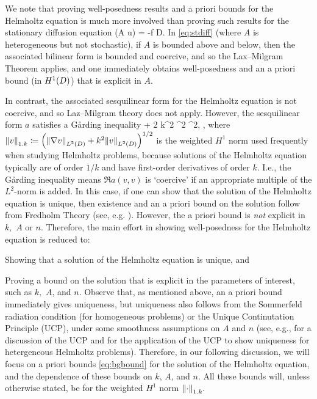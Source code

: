 We note that proving well-posedness results and a priori bounds for the Helmholtz equation is much more involved than proving such results for the stationary diffusion equation
\beq\label{eq:stdiff}
\grad \cdot \mleft(A \grad u\mright) = -f \tin D.
\eeq
In \eqref{eq:stdiff} (where $A$ is heterogeneous but not stochastic), if $A$ is bounded above and below, then the associated bilinear form is bounded and coercive, and so the Lax--Milgram Theorem applies, and one immediately obtains well-posedness and an a priori bound (in $\HoD$) that is explicit in $A$.

In contrast, the associated sesquilinear form for the Helmholtz equation is not coercive, and so Laz--Milgram theory does not apply. However, the sesquilinear form $a$ satisfies a G\r{a}rding inequality
\beq\label{eq:gardingbrief}
 + 2 k^2 \nmax {}^2 \geq {}^2,
\eeq
, where $\NW{v} \de \mleft(\NLtD{\grad v} + k^2 \NLtD{v}\mright)^{1/2}$ is the weighted $H^1$ norm used frequently when studying Helmholtz problems, because solutions of the Helmholtz equation typically are of order $1/k$ and have first-order derivatives of order $k$. I.e., the G\r{a}rding inequality means $\Re{a(v,v)}$ is `coercive' if an appropriate multiple of the $L^2$-norm is added. In this case, if one can show that the solution of the Helmholtz equation is unique, then existence and an a priori bound on the solution follow from Fredholm Theory (see, e.g. \cite[Theorems 5.10 and 5.18]{Sp:15}). However, the a priori bound is \emph{not} explicit in $k,$ $A$ or $n$. Therefore, the main effort in showing well-posedness for the Helmholtz equation is reduced to:
\ben
\item Showing that a solution of the Helmholtz equation is unique, and
  \item Proving a bound on the solution that is explicit in the parameters of interest, such as $k,$ $A$, and $n$.
    \een
    Observe that, as mentioned above, an a priori bound immediately gives uniqueness, but uniqueness also follows from the Sommerfeld radiation condition (for homogeneous problems) or the Unique Continutation Principle (UCP), under some smoothness assumptions on $A$ and $n$ (see, e.g., \cite[p. 2871]{GrPeSp:19} for a discussion of the UCP and \cite[Section 2]{GrSa:18} for the application of the UCP to show uniqueness for hetergeneous Helmholtz problems). Therefore, in our following discussion, we will focus on a priori bounds \eqref{eq:bgbound} for the solution of the Helmholtz equation, and the dependence of these bounds on $k$, $A$, and $n.$ All these bounds will, unless otherwise stated, be for the weighted $H^1$ norm $\NW{\cdot}.$

